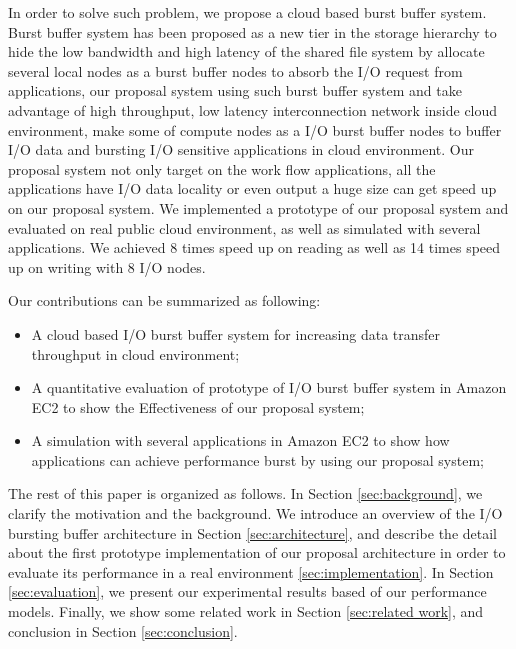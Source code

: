 In order to solve such problem, we propose a cloud based burst buffer system. Burst buffer system
has been proposed as a new tier in the storage hierarchy to hide the low bandwidth and high latency
of the shared file system by allocate several local nodes as a burst buffer nodes to absorb the I/O
request from applications, our proposal system using such burst buffer system and take advantage of
high throughput, low latency interconnection network inside cloud environment, make some of compute
nodes as a I/O burst buffer nodes to buffer I/O data and bursting I/O sensitive applications in cloud environment.
Our proposal system not only target on the work flow applications, all the applications have
I/O data locality or even output a huge size can get speed up on our proposal system.
We implemented a prototype of our proposal system and evaluated on real public cloud environment, as
well as simulated with several applications.
We achieved 8 times speed up on reading as well as 14 times speed up on writing with 8 I/O nodes.

Our contributions can be summarized as following:
\begin{itemize}
	\item A cloud based I/O burst buffer system for increasing data transfer throughput in cloud environment;
	\item A quantitative evaluation of prototype of I/O burst buffer system in Amazon EC2 to show the
	Effectiveness of our proposal system;
    \item A simulation with several applications in Amazon EC2 to show how applications can achieve
    performance burst by using our proposal system;
\end{itemize}
The rest of this paper is organized as follows. 
In Section \ref{sec:background}, we clarify the motivation and the background.
We introduce an overview of the I/O bursting buffer architecture in Section \ref{sec:architecture}, 
and describe the detail about the first prototype implementation of our proposal architecture in
order to evaluate its performance in a real environment \ref{sec:implementation}.
In Section \ref{sec:evaluation}, we present our experimental results based of our performance models.
Finally, we show some related work in Section \ref{sec:related work}, and conclusion in Section \ref{sec:conclusion}.
